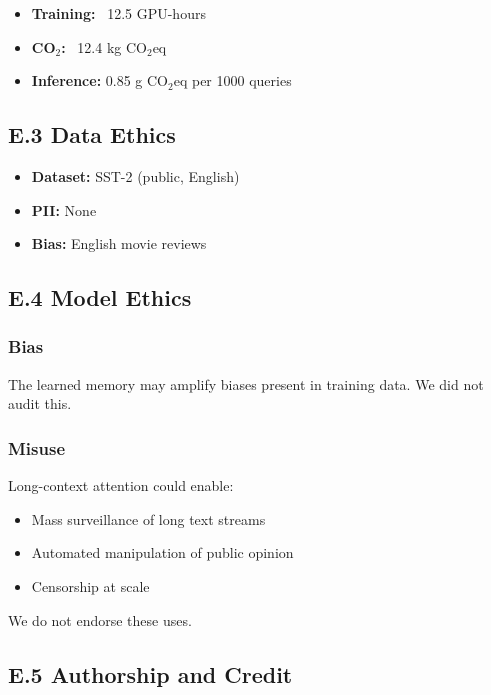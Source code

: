 \begin{itemize}
\item \textbf{Training:} ~12.5 GPU-hours
\item \textbf{CO$_2$:} ~12.4 kg CO$_2$eq
\item \textbf{Inference:} 0.85 g CO$_2$eq per 1000 queries

\end{itemize}
\subsection{E.3 Data Ethics}

\begin{itemize}
\item \textbf{Dataset:} SST-2 (public, English)
\item \textbf{PII:} None
\item \textbf{Bias:} English movie reviews

\end{itemize}
\subsection{E.4 Model Ethics}

\subsubsection{Bias}

The learned memory may amplify biases present in training data. We did 
not audit this.

\subsubsection{Misuse}

Long-context attention could enable:

\begin{itemize}
\item Mass surveillance of long text streams
\item Automated manipulation of public opinion
\item Censorship at scale

\end{itemize}
We do not endorse these uses.

\subsection{E.5 Authorship and Credit}

